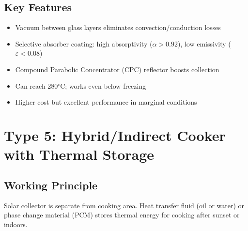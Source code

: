 \documentclass[11pt]{article}
\newcommand{\degC}{$^\circ$C}
\begin{document}
\subsection{Key Features}
\begin{itemize}
    \item Vacuum between glass layers eliminates convection/conduction losses
    \item Selective absorber coating: high absorptivity ($\alpha > 0.92$), low emissivity ($\varepsilon < 0.08$)
    \item Compound Parabolic Concentrator (CPC) reflector boosts collection
    \item Can reach 280\degC; works even below freezing
    \item Higher cost but excellent performance in marginal conditions
\end{itemize}

\newpage
\section{Type 5: Hybrid/Indirect Cooker with Thermal Storage}

\subsection{Working Principle}
Solar collector is separate from cooking area. Heat transfer fluid (oil or water) or phase change material (PCM) stores thermal energy for cooking after sunset or indoors.
\end{document}
